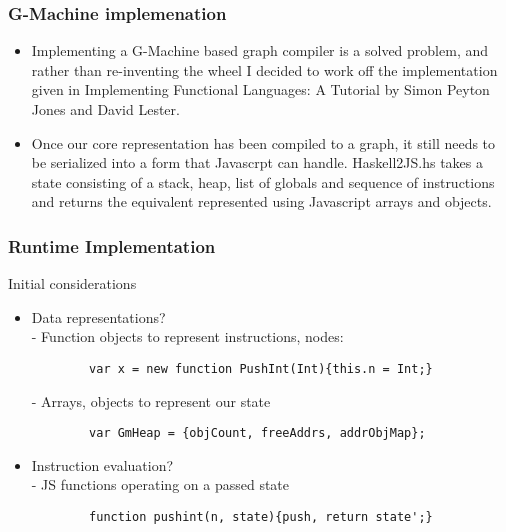 \documentclass{beamer}
\begin{document}
\begin{frame}
	\frametitle{G-Machine implemenation}
	\begin{itemize}
	\item Implementing a G-Machine based graph compiler is 
	a solved
	problem, and rather than re-inventing the wheel I decided
	to work off the implementation given in Implementing 
	Functional Languages: A Tutorial by Simon Peyton Jones
	and David Lester. 
	\item Once our core representation has been compiled to
	a graph, it still needs to be serialized into a form that
	Javascrpt can handle. Haskell2JS.hs takes a state consisting
	of a stack, heap, list of globals and sequence of
	instructions and returns the equivalent represented
	using Javascript arrays and objects.
	\end{itemize}
	
\end{frame}

\begin{frame}[fragile]
	\frametitle{Runtime Implementation}
	Initial considerations
	\begin{itemize}
		\item Data representations? \\
		- Function objects to represent
		instructions, nodes: 
		\begin{verbatim}
		var x = new function PushInt(Int){this.n = Int;}
		\end{verbatim}
		- Arrays, objects to represent our state 
		\begin{verbatim}
		var GmHeap = {objCount, freeAddrs, addrObjMap};
		\end{verbatim}
		\item Instruction evaluation? \\
		- JS functions operating on a passed state 
		\begin{verbatim}
		function pushint(n, state){push, return state';}	
		\end{verbatim}
	\end{itemize}
\end{frame}
\end{document}
